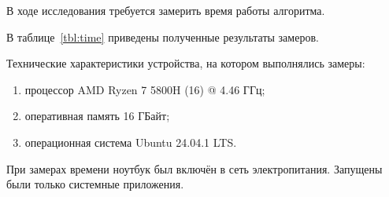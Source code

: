 В ходе исследования требуется замерить время работы алгоритма.

В таблице~\ref{tbl:time} приведены полученные результаты замеров.

Технические характеристики устройства, на котором выполнялись замеры:
\begingroup
\renewcommand\labelenumi{---}
\begin{enumerate}
	\item процессор AMD Ryzen 7 5800H (16) @ 4.46 ГГц;
	\item оперативная память 16 ГБайт;
	\item операционная система Ubuntu 24.04.1 LTS.
\end{enumerate}
\endgroup

При замерах времени ноутбук был включён в сеть электропитания. Запущены были только системные приложения.

